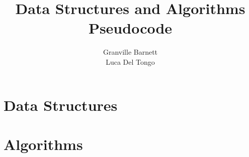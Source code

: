 \documentclass[10pt,oneside,a4paper]{report}
\begin{document}
\title{Data Structures and Algorithms\\Pseudocode}
\author{Granville Barnett\\Luca Del Tongo}
\maketitle

\newpage
\tableofcontents
\newpage



\pagestyle{headings}

\part{Data Structures}







\part{Algorithms}






\appendix


\end{document}

